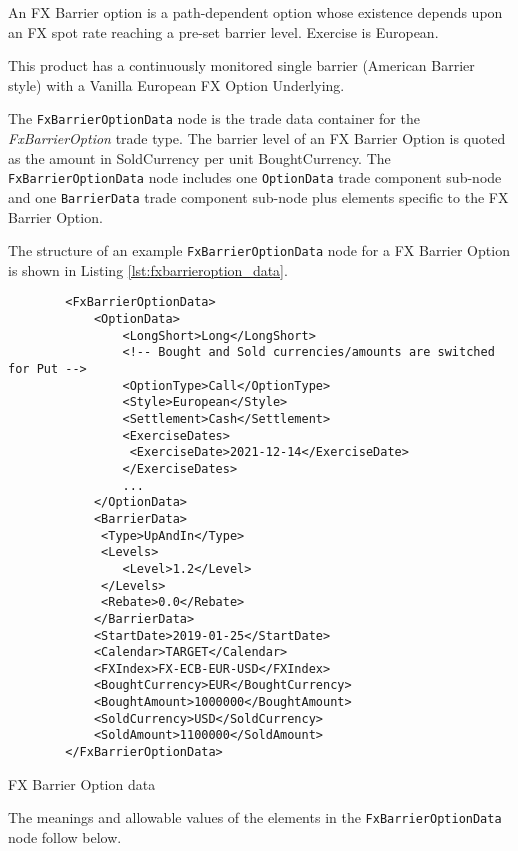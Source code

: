 An FX Barrier option is a path-dependent option whose existence depends upon an FX
spot rate reaching a pre-set barrier level. Exercise is European.

This product has a continuously monitored single barrier (American Barrier style) with a Vanilla European FX
Option Underlying.

\fi

The \lstinline!FxBarrierOptionData!  node is the trade data container for the \emph{FxBarrierOption} trade type.   The barrier level of an FX Barrier Option is quoted as the amount in SoldCurrency
per unit BoughtCurrency. The \lstinline!FxBarrierOptionData!  node includes one  \lstinline!OptionData! trade component sub-node and one \lstinline!BarrierData! trade component sub-node plus elements
specific to the FX Barrier Option. 

The structure of an example \lstinline!FxBarrierOptionData! node for a FX Barrier Option is shown in Listing
\ref{lst:fxbarrieroption_data}.

\begin{listing}[H]
\begin{verbatim}
        <FxBarrierOptionData>
            <OptionData>
                <LongShort>Long</LongShort>
                <!-- Bought and Sold currencies/amounts are switched for Put -->
                <OptionType>Call</OptionType>
                <Style>European</Style>
                <Settlement>Cash</Settlement>                
                <ExerciseDates>
                 <ExerciseDate>2021-12-14</ExerciseDate>
                </ExerciseDates>
                ...
            </OptionData>
            <BarrierData>
             <Type>UpAndIn</Type>
             <Levels>
                <Level>1.2</Level>
             </Levels>
             <Rebate>0.0</Rebate>    
            </BarrierData>
            <StartDate>2019-01-25</StartDate>
            <Calendar>TARGET</Calendar>            
            <FXIndex>FX-ECB-EUR-USD</FXIndex>
            <BoughtCurrency>EUR</BoughtCurrency>
            <BoughtAmount>1000000</BoughtAmount>
            <SoldCurrency>USD</SoldCurrency>
            <SoldAmount>1100000</SoldAmount>
        </FxBarrierOptionData>
\end{verbatim}
\caption{FX Barrier Option data}
\label{lst:fxbarrieroption_data}
\end{listing}

The meanings and allowable values of the elements in the \lstinline!FxBarrierOptionData!  node follow below.

